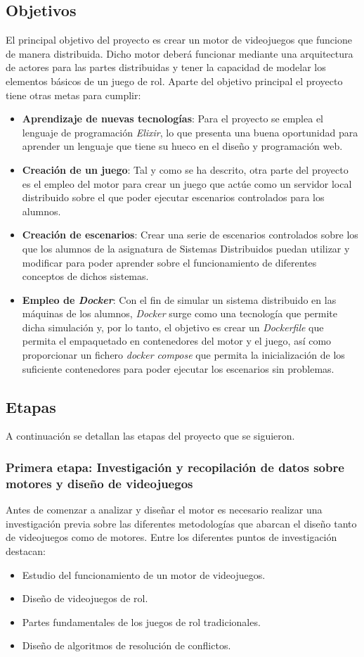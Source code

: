 \subsection{Objetivos}
El principal objetivo del proyecto es crear un motor de videojuegos que funcione de manera distribuida. Dicho motor deberá funcionar mediante una arquitectura de actores para las partes distribuidas y tener la capacidad de modelar los elementos básicos de un juego de rol. Aparte del objetivo principal el proyecto tiene otras metas para cumplir:
\begin{itemize}
	\item \textbf{Aprendizaje de nuevas tecnologías}: Para el proyecto se emplea el lenguaje de programación \textit{Elixir}, lo que presenta una buena oportunidad para aprender un lenguaje que tiene su hueco en el diseño y programación web.
	\item \textbf{Creación de un juego}: Tal y como se ha descrito, otra parte del proyecto es el empleo del motor para crear un juego que actúe como un servidor local distribuido sobre el que poder ejecutar escenarios controlados para los alumnos.
	\item \textbf{Creación de escenarios}: Crear una serie de escenarios controlados sobre los que los alumnos de la asignatura de Sistemas Distribuidos puedan utilizar y modificar para poder aprender sobre el funcionamiento de diferentes conceptos de dichos sistemas.
	\item \textbf{Empleo de \textit{Docker}}: Con el fin de simular un sistema distribuido en las máquinas de los alumnos, \textit{Docker} surge como una tecnología que permite dicha simulación y, por lo tanto, el objetivo es crear un \textit{Dockerfile} que permita el empaquetado en contenedores del motor y el juego, así como proporcionar un fichero \textit{docker compose} que permita la inicialización de los suficiente contenedores para poder ejecutar los escenarios sin problemas.
\end{itemize}
\subsection{Etapas}
A continuación se detallan las etapas del proyecto que se siguieron.
\subsubsection{Primera etapa: Investigación y recopilación de datos sobre motores y diseño de videojuegos}
Antes de comenzar a analizar y diseñar el motor es necesario realizar una investigación previa sobre las diferentes metodologías que abarcan el diseño tanto de videojuegos como de motores. Entre los diferentes puntos de investigación destacan:
\\
\begin{itemize}
	\item Estudio del funcionamiento de un motor de videojuegos.
	\item Diseño de videojuegos de rol.
	\item Partes fundamentales de los juegos de rol tradicionales.
	\item Diseño de algoritmos de resolución de conflictos.
\end{itemize}

